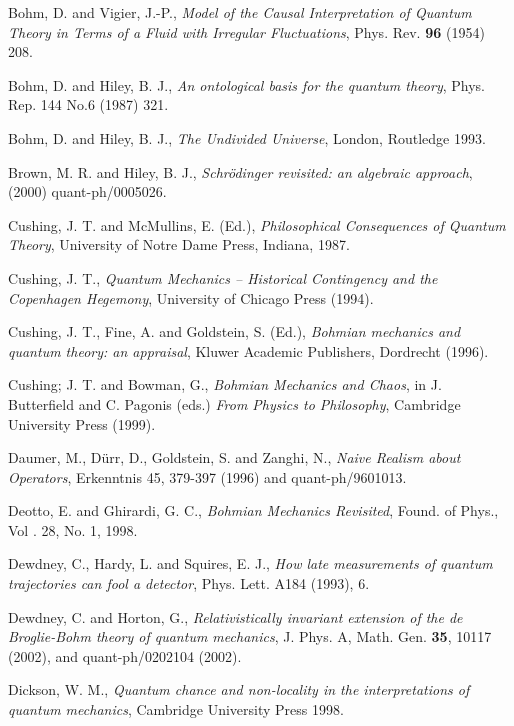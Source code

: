\begin{thebibliography}{10}
 Bohm, D. and Vigier, J.-P., {\em Model of the Causal Interpretation of 
  Quantum Theory in Terms of a Fluid with Irregular Fluctuations}, Phys. Rev. {\bf 96} (1954) 
  208.

 Bohm, D. and Hiley, B. J., {\em An ontological basis for the quantum 
theory},  Phys. Rep. 144 No.6 (1987) 321.

 Bohm, D. and Hiley, B. J., {\em The Undivided Universe},
  London, Routledge 1993. 

 Brown, M. R. and Hiley, B. J., {\em Schr\"odinger revisited: an 
algebraic approach}, (2000) quant-ph/0005026.

 Cushing, J. T.  and McMullins, E. (Ed.), {\em Philosophical Consequences 
  of Quantum Theory}, University of Notre Dame Press,
  Indiana, 1987.

 Cushing, J. T., {\em Quantum Mechanics --
    Historical Contingency and the Copenhagen Hegemony}, University of
  Chicago Press (1994).

 Cushing, J. T., Fine, A. and Goldstein, S. (Ed.), 
  {\em Bohmian mechanics and quantum theory: an appraisal},  Kluwer Academic 
  Publishers, Dordrecht (1996).

 Cushing; J. T. and Bowman, G., {\em Bohmian Mechanics and Chaos}, in J. Butterfield and C. Pagonis (eds.) 
{\em From Physics to Philosophy}, Cambridge University Press (1999). 

 Daumer, M., D\"urr, D., Goldstein, S.  and Zanghi, N., {\em Naive 
    Realism about Operators},  Erkenntnis 45, 379-397 (1996) and
    quant-ph/9601013. 

 Deotto, E. and Ghirardi, G. C., {\em Bohmian Mechanics Revisited}, Found. of Phys., Vol . 28, No. 1, 1998.

 Dewdney, C., Hardy, L. and Squires, E. J., {\em How late 
  measurements of quantum trajectories can fool a detector}, Phys. Lett. A184 
  (1993), 6.

 Dewdney, C. and Horton, G., {\em Relativistically invariant 
  extension of the de Broglie-Bohm theory of quantum mechanics}, J. Phys. A,
  Math. Gen. {\bf 35}, 10117 (2002), and quant-ph/0202104 (2002). 

 Dickson, W. M., {\em Quantum chance and non-locality in the interpretations of quantum mechanics}, Cambridge 
  University Press 1998.


\end{thebibliography}

